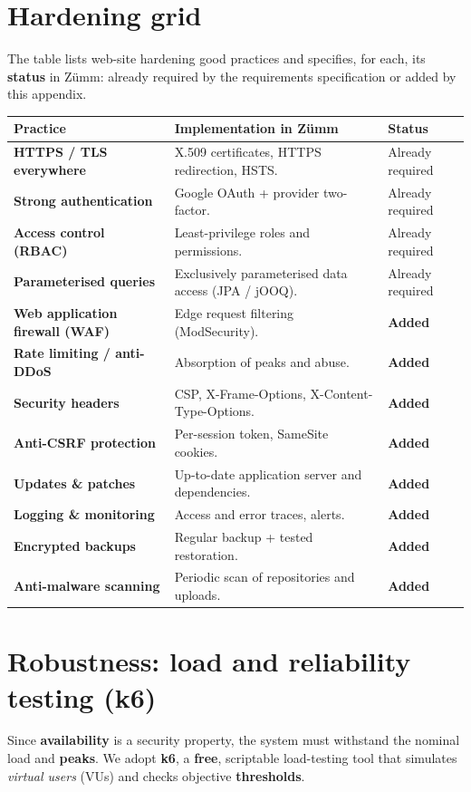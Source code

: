 \section{Hardening grid}
The table lists web-site hardening good practices and specifies, for each, its
\textbf{status} in Zümm: already required by the requirements specification or
added by this appendix.
\begin{xltabular}{\textwidth}{>{\bfseries}p{4.2cm} X C{2.2cm}}
\toprule
\textbf{Practice} & \textbf{Implementation in Zümm} & \textbf{Status} \\
\midrule
\endhead
HTTPS / TLS everywhere & X.509 certificates, HTTPS redirection, HSTS. & Already required \\
Strong authentication & Google OAuth + provider two-factor. & Already required \\
Access control (RBAC) & Least-privilege roles and permissions. & Already required \\
Parameterised queries & Exclusively parameterised data access (JPA / jOOQ). & Already required \\
Web application firewall (WAF) & Edge request filtering (ModSecurity). & \textbf{Added} \\
Rate limiting / anti-DDoS & Absorption of peaks and abuse. & \textbf{Added} \\
Security headers & CSP, X-Frame-Options, X-Content-Type-Options. & \textbf{Added} \\
Anti-CSRF protection & Per-session token, SameSite cookies. & \textbf{Added} \\
Updates \& patches & Up-to-date application server and dependencies. & \textbf{Added} \\
Logging \& monitoring & Access and error traces, alerts. & \textbf{Added} \\
Encrypted backups & Regular backup + tested restoration. & \textbf{Added} \\
Anti-malware scanning & Periodic scan of repositories and uploads. & \textbf{Added} \\
\bottomrule
\end{xltabular}

\section{Robustness: load and reliability testing (k6)}
Since \textbf{availability} is a security property, the system must withstand
the nominal load and \textbf{peaks}. We adopt \textbf{k6}, a \textbf{free},
scriptable load-testing tool that simulates \emph{virtual users} (VUs) and
checks objective \textbf{thresholds}.

